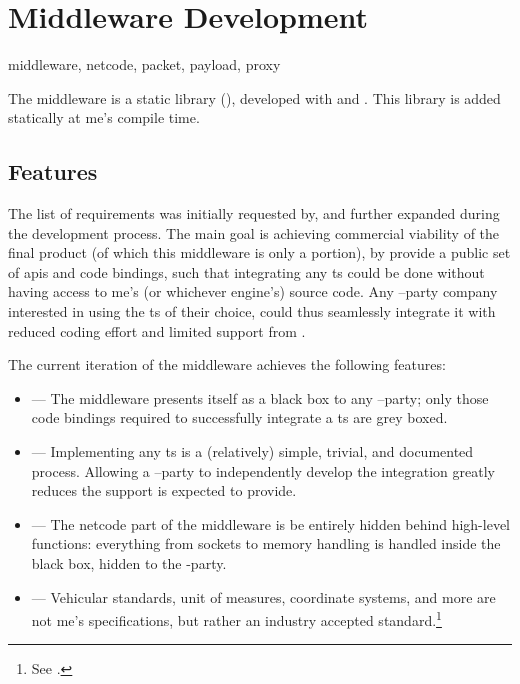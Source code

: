 \chapter{Middleware Development}\label{ch:middleware}

\begin{keywords}
	middleware, netcode, packet, payload, proxy
\end{keywords}

The \gls{middleware} is a  static library (), developed with  and . This library is added statically at \gls{me}'s compile time.

\section{Features}\label{sc:middleware:features}

The list of requirements was initially requested by, and further expanded during the development process. The main goal is achieving commercial viability of the final product (of which this \gls{middleware} is only a portion), by provide a public set of \glspl{api} and code bindings, such that integrating any \gls{ts} could be done without having access to \gls{me}'s (or whichever engine's) source code. Any --party company interested in using the \gls{ts} of their choice, could thus seamlessly integrate it with reduced coding effort and limited support from .

The current iteration of the \gls{middleware} achieves the following \glspl{feature}:

\begin{itemize}
	\item {} --- The \gls{middleware} presents itself as a black box to any --party; only those code bindings required to successfully integrate a \gls{ts} are grey boxed.
	\item {} --- Implementing any \gls{ts} is a (relatively) simple, trivial, and documented process. Allowing a --party to independently develop the integration greatly reduces the support  is expected to provide.
	\item {} --- The \gls{netcode} part of the \gls{middleware} is be entirely hidden behind high-level functions: everything from sockets to memory handling is handled inside the black box, hidden to the -party.
	\item {} --- Vehicular standards, unit of measures, coordinate systems, and more are not \gls{me}'s specifications, but rather an industry accepted standard.\footnote{See .}
\end{itemize}

